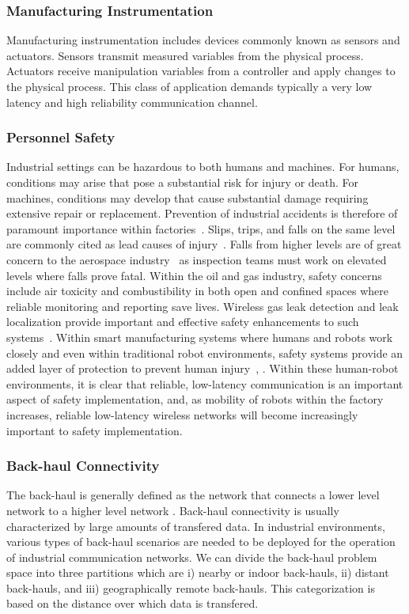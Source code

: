     \subsubsection{Manufacturing Instrumentation}  
    Manufacturing instrumentation includes devices commonly known as sensors and actuators.  Sensors transmit measured variables from the physical process.  Actuators receive manipulation variables from a controller and apply changes to the physical process. This class of application demands typically a very low latency and high reliability communication channel.  
    
    \subsubsection{Personnel Safety}  
    Industrial settings can be hazardous to both humans and machines.  For humans, conditions may arise that pose a substantial risk for injury or death.  For machines, conditions may develop that cause substantial damage requiring extensive repair or replacement.  Prevention of industrial accidents is therefore of paramount importance within factories~\cite{Smith201788}.  Slips, trips, and falls on the same level are commonly cited as lead causes of injury~\cite{Chang2016}. Falls from higher levels are of great concern to the aerospace industry~\cite{Candell2017IWW} as inspection teams must work on elevated levels where falls prove fatal.  Within the oil and gas industry, safety concerns include air toxicity and combustibility in both open and confined spaces where reliable monitoring and reporting save lives. Wireless gas leak detection and leak localization provide important and effective safety enhancements to such systems~\cite{Chraim2016}.  Within smart manufacturing systems where humans and robots work closely and even within traditional robot environments, safety systems provide an added layer of protection to prevent human injury~\cite{Huber:2017:DHI:3029798.3038346}, \cite{Zanchettin2016}.  Within these human-robot environments, it is clear that reliable, low-latency communication is an important aspect of safety implementation, and, as mobility of robots within the factory increases, reliable low-latency wireless networks will become increasingly important to safety implementation.
    
    \subsubsection{Back-haul Connectivity}  The back-haul is generally defined as the network that connects a lower level network to a higher level network \cite{7456186}. Back-haul connectivity is usually characterized by large amounts of transfered data. In industrial environments, various types of back-haul scenarios are needed to be deployed for the operation of industrial communication networks. We can divide the back-haul problem space into three partitions which are i) nearby or indoor back-hauls, ii) distant back-hauls, and iii) geographically remote back-hauls. This categorization is based on the distance over which data is transfered.
    
